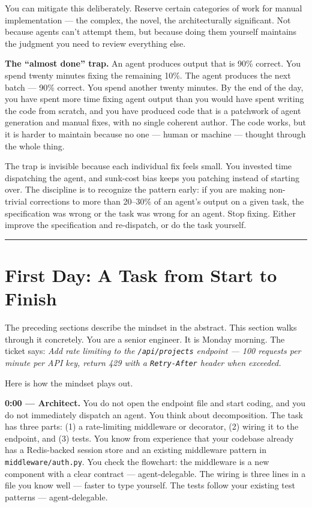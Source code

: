 \documentclass[
  a4paper,
  DIV=11,
  numbers=noendperiod]{scrreprt}
\begin{document}
You can mitigate this deliberately. Reserve certain categories of work
for manual implementation --- the complex, the novel, the
architecturally significant. Not because agents can't attempt them, but
because doing them yourself maintains the judgment you need to review
everything else.

\textbf{The ``almost done'' trap.} An agent produces output that is 90\%
correct. You spend twenty minutes fixing the remaining 10\%. The agent
produces the next batch --- 90\% correct. You spend another twenty
minutes. By the end of the day, you have spent more time fixing agent
output than you would have spent writing the code from scratch, and you
have produced code that is a patchwork of agent generation and manual
fixes, with no single coherent author. The code works, but it is harder
to maintain because no one --- human or machine --- thought through the
whole thing.

The trap is invisible because each individual fix feels small. You
invested time dispatching the agent, and sunk-cost bias keeps you
patching instead of starting over. The discipline is to recognize the
pattern early: if you are making non-trivial corrections to more than
20--30\% of an agent's output on a given task, the specification was
wrong or the task was wrong for an agent. Stop fixing. Either improve
the specification and re-dispatch, or do the task yourself.

\begin{center}\rule{0.5\linewidth}{0.5pt}\end{center}

\section{First Day: A Task from Start to
Finish}\label{first-day-a-task-from-start-to-finish}

The preceding sections describe the mindset in the abstract. This
section walks through it concretely. You are a senior engineer. It is
Monday morning. The ticket says: \emph{Add rate limiting to the
\texttt{/api/projects} endpoint --- 100 requests per minute per API key,
return 429 with a \texttt{Retry-After} header when exceeded.}

Here is how the mindset plays out.

\textbf{0:00 --- Architect.} You do not open the endpoint file and start
coding, and you do not immediately dispatch an agent. You think about
decomposition. The task has three parts: (1) a rate-limiting middleware
or decorator, (2) wiring it to the endpoint, and (3) tests. You know
from experience that your codebase already has a Redis-backed session
store and an existing middleware pattern in \texttt{middleware/auth.py}.
You check the flowchart: the middleware is a new component with a clear
contract --- agent-delegable. The wiring is three lines in a file you
know well --- faster to type yourself. The tests follow your existing
test patterns --- agent-delegable.
\end{document}
